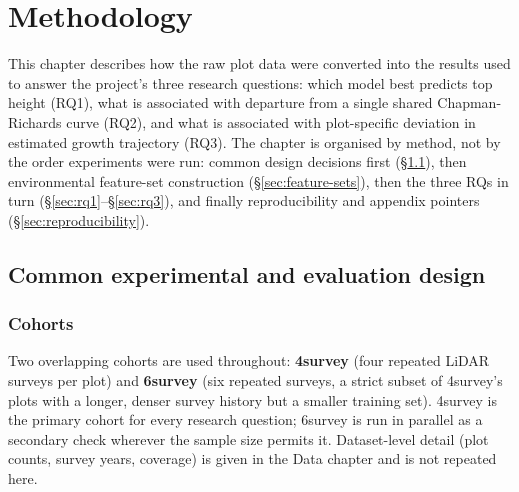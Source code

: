 \documentclass[11pt,a4paper]{report}
\begin{document}

\chapter{Methodology}
\label{ch:methodology}

This chapter describes how the raw plot data were converted into the results used to answer the
project's three research questions: which model best predicts top height (RQ1), what is
associated with departure from a single shared Chapman-Richards curve (RQ2), and what is
associated with plot-specific deviation in estimated growth trajectory (RQ3). The chapter is
organised by method, not by the order experiments were run: common design decisions first
(\S\ref{sec:common-design}), then environmental feature-set construction
(\S\ref{sec:feature-sets}), then the three RQs in turn (\S\ref{sec:rq1}--\S\ref{sec:rq3}), and
finally reproducibility and appendix pointers (\S\ref{sec:reproducibility}).

\section{Common experimental and evaluation design}
\label{sec:common-design}

\subsection{Cohorts}

Two overlapping cohorts are used throughout: \textbf{4survey} (four repeated LiDAR
surveys per plot) and \textbf{6survey} (six repeated surveys, a strict subset of 4survey's plots
with a longer, denser survey history but a smaller training set). 4survey is the primary cohort
for every research question; 6survey is run in parallel as a secondary check wherever the sample
size permits it. Dataset-level detail (plot counts, survey years, coverage) is given in the Data
chapter and is not repeated here.
\end{document}
